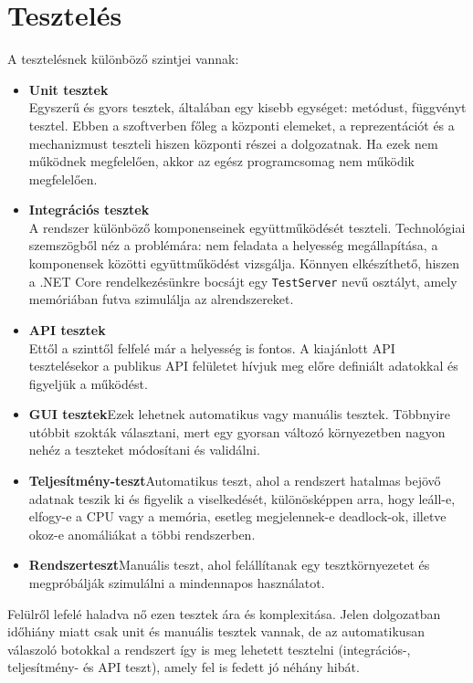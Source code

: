 \documentclass[twoside, a4paper, 12pt]{article}
\begin{document}
\section{Tesztelés}
A tesztelésnek különböző szintjei vannak:
\begin{itemize}
	\item \textbf{Unit tesztek} \\
	Egyszerű és gyors tesztek, általában egy kisebb egységet: metódust, függvényt tesztel. Ebben a szoftverben főleg a központi elemeket, a reprezentációt és a mechanizmust teszteli hiszen központi részei a dolgozatnak. Ha ezek nem működnek megfelelően, akkor az egész programcsomag nem működik megfelelően.
	
	\item \textbf{Integrációs tesztek} \\
	A rendszer különböző komponenseinek együttműködését teszteli. Technológiai szemszögből néz a problémára: nem feladata a helyesség megállapítása, a komponensek közötti együttműködést vizsgálja. Könnyen elkészíthető, hiszen a .NET Core rendelkezésünkre bocsájt egy \texttt{TestServer} nevű osztályt, amely memóriában futva szimulálja az alrendszereket.
	
	\item \textbf{API tesztek} \\
	Ettől a szinttől felfelé már a helyesség is fontos. A kiajánlott API tesztelésekor a publikus API felületet hívjuk meg előre definiált adatokkal és figyeljük a működést.
	
	\item \textbf{GUI tesztek}Ezek lehetnek automatikus vagy manuális tesztek. Többnyire utóbbit szokták választani, mert egy gyorsan változó környezetben nagyon nehéz a teszteket módosítani és validálni.
	
	\item \textbf{Teljesítmény-teszt}Automatikus teszt, ahol a rendszert hatalmas bejövő adatnak teszik ki és figyelik a viselkedését, különösképpen arra, hogy leáll-e, elfogy-e a CPU vagy a memória, esetleg megjelennek-e deadlock-ok, illetve okoz-e anomáliákat a többi rendszerben.
	
	\item \textbf{Rendszerteszt}Manuális teszt, ahol felállítanak egy tesztkörnyezetet és megpróbálják szimulálni a mindennapos használatot.
	
\end{itemize}

Felülről lefelé haladva nő ezen tesztek ára és komplexitása. Jelen dolgozatban időhiány miatt csak unit és manuális tesztek vannak, de az automatikusan válaszoló botokkal a rendszert így is meg lehetett tesztelni (integrációs-, teljesítmény- és API teszt), amely fel is fedett jó néhány hibát.
\end{document}

